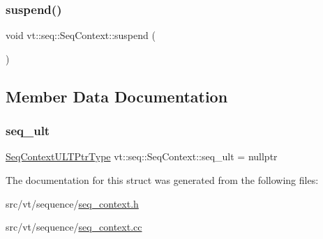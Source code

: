 \mbox{\label{structvt_1_1seq_1_1_seq_context_af53636e2ee35cc96e203e738f9e118b3}} 
\subsubsection{\texorpdfstring{suspend()}{suspend()}}
{\footnotesize\ttfamily void vt\+::seq\+::\+Seq\+Context\+::suspend (\begin{DoxyParamCaption}{ }\end{DoxyParamCaption})}



\subsection{Member Data Documentation}
\mbox{\label{structvt_1_1seq_1_1_seq_context_a8b90e0946bbef6e744a1030699b047ef}} 
\subsubsection{\texorpdfstring{seq\+\_\+ult}{seq\_ult}}
{\footnotesize\ttfamily \hyperlink{structvt_1_1seq_1_1_seq_context_a7e5dc3958df8473c5bcd938f0f2cf933}{Seq\+Context\+U\+L\+T\+Ptr\+Type} vt\+::seq\+::\+Seq\+Context\+::seq\+\_\+ult = nullptr}



The documentation for this struct was generated from the following files\+:\begin{DoxyCompactItemize}
\item 
src/vt/sequence/\hyperlink{seq__context_8h}{seq\+\_\+context.\+h}\item 
src/vt/sequence/\hyperlink{seq__context_8cc}{seq\+\_\+context.\+cc}\end{DoxyCompactItemize}
